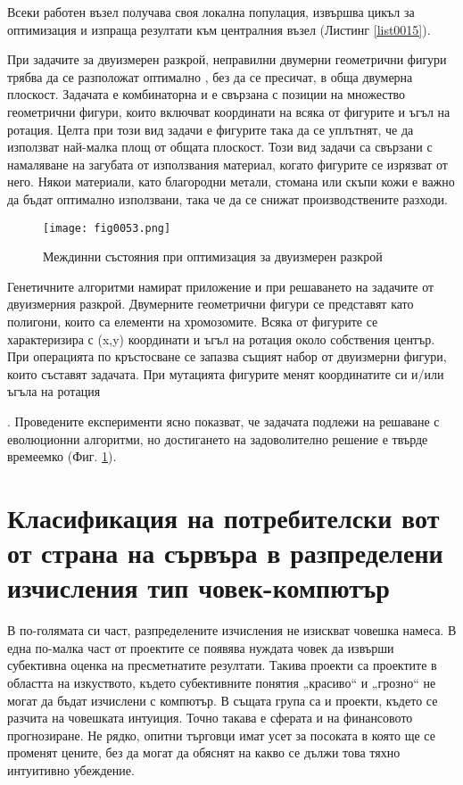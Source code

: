 Всеки работен възел получава своя локална популация, извършва цикъл за оптимизация и изпраща резултати към централния възел (Листинг \ref{list0015}).

При задачите за двуизмерен разкрой, неправилни двумерни геометрични фигури трябва да се разположат оптимално , без да се пресичат, в обща двумерна плоскост. Задачата е комбинаторна и е свързана с позиции на множество геометрични фигури, които включват координати на всяка от фигурите и ъгъл на ротация. Целта при този вид задачи е фигурите така да се уплътнят, че да използват най-малка площ от общата плоскост. Този вид задачи са свързани с намаляване на загубата от използвания материал, когато фигурите се изрязват от него. Някои материали, като благородни метали, стомана или скъпи кожи е важно да бъдат оптимално използвани, така че да се снижат производствените разходи. 

\begin{figure}[H]
  \centering
  \texttt{[image: fig0053.png]}
  \caption{Междинни състояния при оптимизация за двуизмерен разкрой}
\label{fig0053}
\end{figure}

Генетичните алгоритми намират приложение и при решаването на задачите от двуизмерния разкрой. Двумерните геометрични фигури се представят като полигони, които са елементи на хромозомите. Всяка от фигурите се характеризира с (x,y) координати и ъгъл на ротация около собствения център. При операцията по кръстосване се запазва същият набор от двуизмерни фигури, които съставят задачата. При мутацията фигурите менят координатите си и/или ъгъла на ротация\begin{comment}\cite{Balabanov-03}\end{comment}. Проведените експерименти ясно показват, че задачата подлежи на решаване с еволюционни алгоритми, но достигането на задоволително решение е твърде времеемко (Фиг. \ref{fig0053}).

\section{Класификация на потребителски вот от страна на сървъра в разпределени изчисления тип човек-компютър}

В по-голямата си част, разпределените изчисления не изискват човешка намеса. В една по-малка част от проектите се появява нуждата човек да извърши субективна оценка на пресметнатите резултати. Такива проекти са проектите в областта на изкуството, където субективните понятия „красиво“ и „грозно“ не могат да бъдат изчислени с компютър. В същата група са и проекти, където се разчита на човешката интуиция. Точно такава е сферата и на финансовото прогнозиране. Не рядко, опитни търговци имат усет за посоката в която ще се променят цените, без да могат да обяснят на какво се дължи това тяхно интуитивно убеждение. 

